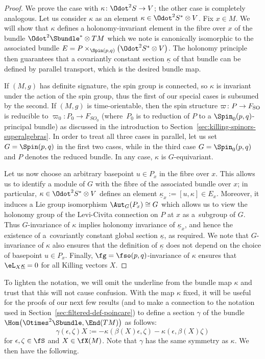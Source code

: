 \begin{proof}
	We prove the case with $\kappa\colon \Odot^2S\to V$; the other case is completely analogous. Let us consider $\kappa$ as an element $\kappa\in\Odot^2S^*\otimes V$. Fix $x\in M$. We will show that $\kappa$ defines a holonomy-invariant element in the fibre over $x$ of the bundle $\Odot^2\Sbundle^*\otimes TM$ which we note is canonically isomorphic to the associated bundle $E=P\times_{\Spin(p,q)}\bigl(\Odot^2S^*\otimes V\bigr)$. The holonomy principle then guarantees that a covariantly constant section $\underline\kappa$ of that bundle can be defined by parallel transport, which is the desired bundle map.
	
	If $(M,g)$ has definite signature, the spin group is connected, so $\kappa$ is invariant under the action of the spin group, thus the first of our special cases is subsumed by the second. If $(M,g)$ is time-orientable, then the spin structure $\varpi\colon P\to F_{\rm SO}$ is reducible to $\varpi_0\colon P_0\to F_{SO_0}$ (where~$P_0$ is to reduction of $P$ to a $\Spin_0(p,q)$-principal bundle) as discussed in the introduction to Section~\ref{sec:killing-spinors-superalgebras}. In order to treat all three cases in parallel, let us set $G=\Spin(p,q)$ in the first two cases, while in the third case $G=\Spin_0(p,q)$ and $P$ denotes the reduced bundle. In any case, $\kappa$ is $G$-equivariant.
	
	Let us now choose an arbitrary basepoint $u\in P_x$ in the fibre over $x$. This allows us to identify a module of $G$ with the fibre of the associated bundle over $x$; in particular, $\kappa\in\Odot^2S^*\otimes V$ defines an element $\underline\kappa_x:=[u,\kappa]\in E_x$. Moreover, it induces a Lie group isomorphism $\Aut_G(P_x)\cong G$ which allows us to view the holonomy group of the Levi-Civita connection on $P$ at $x$ as a~subgroup of $G$. Thus $G$-invariance of $\kappa$ implies holonomy invariance of $\underline\kappa_x$, and hence the existence of a~covariantly constant global section $\underline\kappa$, as required. We note that $G$-invariance of $\kappa$ also ensures that the definition of $\underline\kappa$ does not depend on the choice of basepoint $u\in P_x$. Finally, $\fg=\fso(p,q)$-invariance of $\kappa$ ensures that $\eL_X\underline\kappa=0$ for all Killing vectors $X$.
\end{proof}

To lighten the notation, we will omit the underline from the bundle map $\kappa$ and trust that this will not cause confusion. With the map $\kappa$ fixed, it will be useful for the proofs of our next few results (and to make a connection to the notation used in Section~\ref{sec:filtered-def-poincare}) to define a section $\gamma$ of the bundle $\Hom\bigl(\Otimes^2\Sbundle,\End(TM)\bigr)$ as follows:
\begin{equation}\label{eq:gamma-geom-def}
	\gamma(\epsilon,\zeta)X := - \kappa(\beta(X)\epsilon,\zeta) - \kappa(\epsilon,\beta(X)\zeta)
\end{equation}
for $\epsilon,\zeta\in\fS$ and $X\in\fX(M)$. Note that $\gamma$ has the same symmetry as $\kappa$. We then have the following.

